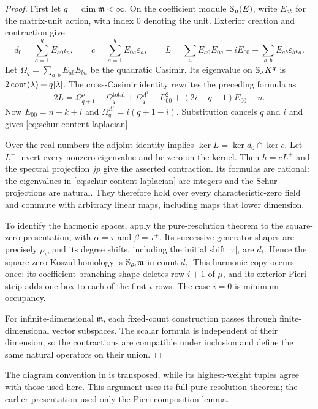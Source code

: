 \begin{proof}
First let $q=\dim\mathfrak m<\infty$. On the coefficient module
$\mathbb S_\mu(E)$, write $E_{ab}$ for the matrix-unit action, with
index $0$ denoting the unit. Exterior creation and contraction give
\[
 d_0=\sum_{a=1}^q E_{a0}\iota_a,
 \qquad c=\sum_{a=1}^qE_{0a}\varepsilon_a,
 \qquad
 L=\sum_aE_{a0}E_{0a}+iE_{00}-\sum_{a,b}E_{ab}\varepsilon_b\iota_a.
\]
Let $\Omega_q=\sum_{a,b}E_{ab}E_{ba}$ be the quadratic Casimir.
Its eigenvalue on $\mathbb S_\lambda K^q$ is
$2\operatorname{cont}(\lambda)+q|\lambda|$. The cross-Casimir identity rewrites
the preceding formula as
\[
 2L=\Omega_{q+1}^{\mu}-\Omega_q^{\mathrm{total}}
       +\Omega_q^{\Lambda^i}
       -E_{00}^2+(2i-q-1)E_{00}+n.
\]
Now $E_{00}=n-k+i$ and
$\Omega_q^{\Lambda^i}=i(q+1-i)$. Substitution cancels $q$ and $i$
and gives \eqref{eq:schur-content-laplacian}.

Over the real numbers the adjoint identity implies
$\ker L=\ker d_0\cap\ker c$. Let $L^+$ invert every nonzero
eigenvalue and be zero on the kernel. Then $h=cL^+$ and the spectral
projection $jp$ give the asserted contraction. Its formulas are
rational: the eigenvalues in \eqref{eq:schur-content-laplacian}
are integers and the Schur projections are natural. They therefore
hold over every characteristic-zero field and commute with arbitrary
linear maps, including maps that lower dimension.

To identify the harmonic spaces, apply the pure-resolution theorem
\cite[Theorem~2.2]{SamWeyman} to the square-zero presentation, with
$\alpha=\tau$ and $\beta=\tau^+$. Its successive generator shapes
are precisely $\rho_i$, and its degree shifts, including the initial
shift $|\tau|$, are $d_i$. Hence the square-zero Koszul homology is
$\mathbb S_{\rho_i}\mathfrak m$ in count $d_i$. This harmonic copy
occurs once: its coefficient branching shape deletes row $i+1$
of $\mu$, and its exterior Pieri strip adds one box to each of the
first $i$ rows. The case $i=0$ is minimum occupancy.

For infinite-dimensional $\mathfrak m$, each fixed-count construction
passes through finite-dimensional vector subspaces. The scalar formula
is independent of their dimension, so the contractions are compatible
under inclusion and define the same natural operators on their union.
\end{proof}

The diagram convention in \cite{SamWeyman} is transposed, while its
highest-weight tuples agree with those used here. This argument uses
its full pure-resolution theorem; the earlier presentation used only
the Pieri composition lemma.

